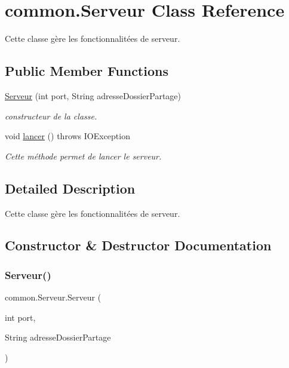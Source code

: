\hypertarget{classcommon_1_1Serveur}{}\section{common.\+Serveur Class Reference}
\label{classcommon_1_1Serveur}


Cette classe gère les fonctionnalitées de serveur.  


\subsection*{Public Member Functions}
\begin{DoxyCompactItemize}
\item 
\hyperlink{classcommon_1_1Serveur_aef95775f670ec2ecd40e72111b125889}{Serveur} (int port, String adresse\+Dossier\+Partage)
\begin{DoxyCompactList}\small\item\em constructeur de la classe. \end{DoxyCompactList}\item 
void \hyperlink{classcommon_1_1Serveur_a9924019a4577e360dafa9ab6df2d4ffd}{lancer} ()  throws I\+O\+Exception 
\begin{DoxyCompactList}\small\item\em Cette méthode permet de lancer le serveur. \end{DoxyCompactList}\end{DoxyCompactItemize}


\subsection{Detailed Description}
Cette classe gère les fonctionnalitées de serveur. 

\subsection{Constructor \& Destructor Documentation}
\mbox{\label{classcommon_1_1Serveur_aef95775f670ec2ecd40e72111b125889}} 
\subsubsection{\texorpdfstring{Serveur()}{Serveur()}}
{\footnotesize\ttfamily common.\+Serveur.\+Serveur (\begin{DoxyParamCaption}\item[{int}]{port,  }\item[{String}]{adresse\+Dossier\+Partage }\end{DoxyParamCaption})\hspace{0.3cm}{\ttfamily [inline]}}



